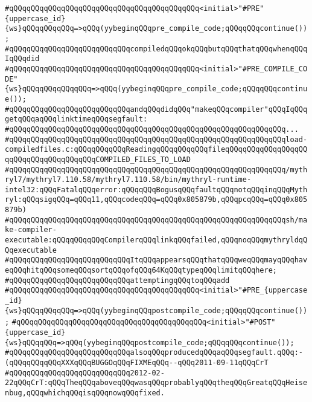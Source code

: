 \verb|#qQQqqQQqqQQqqQQqqQQqqQQqqQQqqQQqqQQqqQQqqQQq<initial>"#PRE"{uppercase_id}{ws}qQQqqQQqqQQq=>qQQq(yybeginqQQqpre_compile_code;qQQqqQQqcontinue());|\newline
\verb|#qQQqqQQqqQQqqQQqqQQqqQQqqQQqcompiledqQQqokqQQqbutqQQqthatqQQqwhenqQQqIqQQqdid|\newline
\verb|#qQQqqQQqqQQqqQQqqQQqqQQqqQQqqQQqqQQqqQQqqQQq<initial>"#PRE_COMPILE_CODE"{ws}qQQqqQQqqQQqqQQq=>qQQq(yybeginqQQqpre_compile_code;qQQqqQQqcontinue());|\newline
\verb|#qQQqqQQqqQQqqQQqqQQqqQQqqQQqandqQQqdidqQQq"makeqQQqcompiler"qQQqIqQQqgetqQQqaqQQqlinktimeqQQqsegfault:|\newline
\verb|#qQQqqQQqqQQqqQQqqQQqqQQqqQQqqQQqqQQqqQQqqQQqqQQqqQQqqQQqqQQqqQQq...|\newline
\verb|#qQQqqQQqqQQqqQQqqQQqqQQqqQQqqQQqqQQqqQQqqQQqqQQqqQQqqQQqqQQqqQQqload-compiledfiles.c:qQQqqQQqqQQqReadingqQQqqQQqqQQqfileqQQqqQQqqQQqqQQqqQQqqQQqqQQqqQQqqQQqqQQqCOMPILED_FILES_TO_LOAD|\newline
\verb|#qQQqqQQqqQQqqQQqqQQqqQQqqQQqqQQqqQQqqQQqqQQqqQQqqQQqqQQqqQQqqQQq/mythryl7/mythryl7.110.58/mythryl7.110.58/bin/mythryl-runtime-intel32:qQQqFatalqQQqerror:qQQqqQQqBogusqQQqfaultqQQqnotqQQqinqQQqMythryl:qQQqsigqQQq=qQQq11,qQQqcodeqQQq=qQQq0x805879b,qQQqpcqQQq=qQQq0x805879b)|\newline
\verb|#qQQqqQQqqQQqqQQqqQQqqQQqqQQqqQQqqQQqqQQqqQQqqQQqqQQqqQQqqQQqqQQqsh/make-compiler-executable:qQQqqQQqqQQqCompilerqQQqlinkqQQqfailed,qQQqnoqQQqmythryldqQQqexecutable|\newline
\verb|#qQQqqQQqqQQqqQQqqQQqqQQqqQQqItqQQqappearsqQQqthatqQQqweqQQqmayqQQqhaveqQQqhitqQQqsomeqQQqsortqQQqofqQQq64KqQQqtypeqQQqlimitqQQqhere;|\newline
\verb|#qQQqqQQqqQQqqQQqqQQqqQQqqQQqattemptingqQQqtoqQQqadd|\newline
\verb|#qQQqqQQqqQQqqQQqqQQqqQQqqQQqqQQqqQQqqQQqqQQq<initial>"#PRE_{uppercase_id}{ws}qQQqqQQqqQQq=>qQQq(yybeginqQQqpostcompile_code;qQQqqQQqcontinue());|\newline
\verb|#qQQqqQQqqQQqqQQqqQQqqQQqqQQqqQQqqQQqqQQqqQQq<initial>"#POST"{uppercase_id}{ws}qQQqqQQq=>qQQq(yybeginqQQqpostcompile_code;qQQqqQQqcontinue());|\newline
\verb|#qQQqqQQqqQQqqQQqqQQqqQQqqQQqalsoqQQqproducedqQQqaqQQqsegfault.qQQq:-(qQQqqQQqqQQqXXXqQQqBUGGOqQQqFIXMEqQQq--qQQq2011-09-11qQQqCrT|\newline
\verb|#qQQqqQQqqQQqqQQqqQQqqQQqqQQq2012-02-22qQQqCrT:qQQqTheqQQqaboveqQQqwasqQQqprobablyqQQqtheqQQqGreatqQQqHeisenbug,qQQqwhichqQQqisqQQqnowqQQqfixed.|\newline

